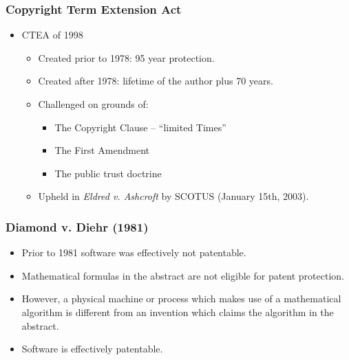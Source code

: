 \documentclass{beamer}
\begin{document}
\begin{frame}[t]
    \frametitle{Copyright Term Extension Act}
  \begin{itemize}
    \item<+-> CTEA of 1998
      \begin{itemize}
        \item<+-> Created prior to 1978: 95 year protection.
        \item<+-> Created after 1978: lifetime of the author plus 70 years.
        \item<+-> Challenged on grounds of:
        \begin{itemize} %
            \item<+-> The Copyright Clause -- ``limited Times''
            \item<+-> The First Amendment
            \item<+-> The public trust doctrine
        \end{itemize}
        \item<+-> Upheld in \emph{Eldred v. Ashcroft} by SCOTUS (January 15th, 2003).
    \end{itemize}
  \end{itemize}
\end{frame}

\begin{frame}[t]
 \frametitle{Diamond v. Diehr (1981)}
 \begin{itemize}
     \item<+-> Prior to 1981 software was effectively not patentable.
     \item<+-> Mathematical formulas in the abstract are not eligible for patent protection.
     \item<+-> However, a physical machine or process which makes use of a mathematical algorithm is different from an invention which claims the algorithm in the abstract.
     \item<+-> Software is effectively patentable.
 \end{itemize}
\end{frame}
\end{document}
